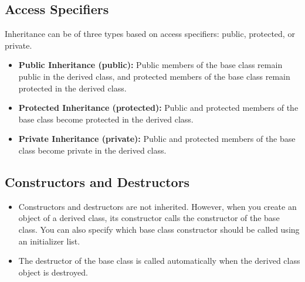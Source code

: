\documentclass{report}
\begin{document}
    \subsection{Access Specifiers}
    \bigbreak \noindent 
    Inheritance can be of three types based on access specifiers: public, protected, or private.
    \begin{itemize}
        \item \textbf{Public Inheritance (public):} Public members of the base class remain public in the derived class, and protected members of the base class remain protected in the derived class.
        \item \textbf{Protected Inheritance (protected):} Public and protected members of the base class become protected in the derived class.
        \item \textbf{Private Inheritance (private):} Public and protected members of the base class become private in the derived class.
    \end{itemize}

    \pagebreak \bigbreak \noindent 
    \subsection{Constructors and Destructors}
    \bigbreak \noindent 
    \begin{concept}
       \begin{itemize}
           \item Constructors and destructors are not inherited. However, when you create an object of a derived class, its constructor calls the constructor of the base class. You can also specify which base class constructor should be called using an initializer list.
           \item The destructor of the base class is called automatically when the derived class object is destroyed.
       \end{itemize} 
    \end{concept}

    \bigbreak \noindent 
\end{document}
